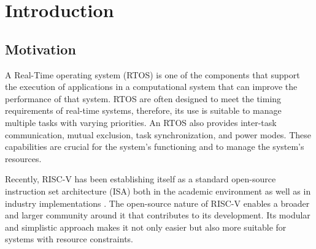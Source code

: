 
\chapter{Introduction}
\label{chapter:introduction}

\section{Motivation}
\label{section:motivation}

A Real-Time operating system (RTOS) is one of the components that support the execution of applications in a computational system that can improve the performance of that system. RTOS are often designed to meet the timing requirements of real-time systems, therefore, its use is suitable to manage multiple tasks with varying priorities. An RTOS also provides inter-task communication, mutual exclusion, task synchronization, and power modes. These capabilities are crucial for the system's functioning and to manage the system's resources.

Recently, RISC-V has been establishing itself as a standard open-source instruction set architecture (ISA) both in the academic environment as well as in industry implementations \cite{Will_RISC-V_Revolutionize_Computing}. The open-source nature of RISC-V enables a broader and larger community around it that contributes to its development. Its modular and simplistic approach makes it not only easier but also more suitable for systems with resource constraints.


